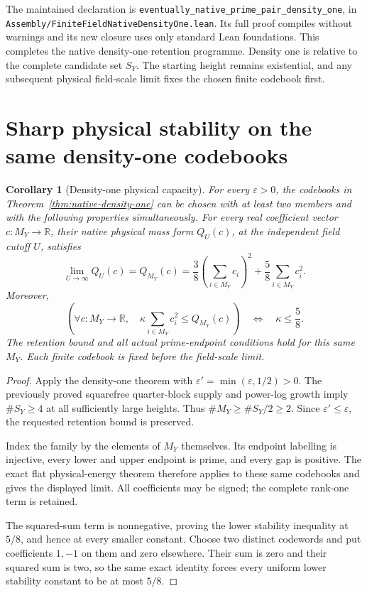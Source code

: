 \documentclass[11pt]{article}
\newtheorem{corollary}[theorem]{Corollary}
\begin{document}
The maintained declaration is
\texttt{eventually\_native\_prime\_pair\_density\_one}, in
\texttt{Assembly/\allowbreak FiniteFieldNativeDensityOne.\allowbreak lean}.
Its full proof compiles without warnings and its new closure
uses only standard Lean foundations.
This completes the native density-one retention programme.
Density one is relative to the complete candidate set \(S_Y\).
The starting height remains existential, and any subsequent
physical field-scale limit fixes the chosen finite codebook first.

\section{Sharp physical stability on the same density-one codebooks}
\label{sec:native-density-one-physical}

\begin{corollary}[Density-one physical capacity]
\label{cor:native-density-one-physical}
For every \(\varepsilon>0\), the codebooks in
Theorem~\ref{thm:native-density-one} can be chosen with at least
two members and with the following properties simultaneously.
For every real coefficient vector \(c:M_Y\to\mathbb R\), their
native physical mass form \(Q_U(c)\), at the independent field
cutoff \(U\), satisfies
\[
 \lim_{U\to\infty}Q_U(c)
   =Q_{M_Y}(c)
   =\frac38\left(\sum_{i\in M_Y}c_i\right)^2
       +\frac58\sum_{i\in M_Y}c_i^2.
\]
Moreover,
\[
 \left(\forall c:M_Y\to\mathbb R,\quad
       \kappa\sum_{i\in M_Y}c_i^2\le Q_{M_Y}(c)\right)
       \quad\Longleftrightarrow\quad \kappa\le\frac58 .
\]
The retention bound and all actual prime-endpoint conditions hold
for this same \(M_Y\). Each finite codebook is fixed before
the field-scale limit.
\end{corollary}

\begin{proof}
Apply the density-one theorem with
\(\varepsilon'=\min(\varepsilon,1/2)>0\).
The previously proved squarefree quarter-block supply and
power-log growth imply \(\#S_Y\ge4\) at all sufficiently large
heights. Thus \(\#M_Y\ge\#S_Y/2\ge2\).
Since \(\varepsilon'\le\varepsilon\), the requested retention
bound is preserved.

Index the family by the elements of \(M_Y\) themselves.
Its endpoint labelling is injective, every lower and upper
endpoint is prime, and every gap is positive.
The exact flat physical-energy theorem therefore applies to
these same codebooks and gives the displayed limit.
All coefficients may be signed; the complete rank-one term
is retained.

The squared-sum term is nonnegative, proving the lower
stability inequality at \(5/8\), and hence at every smaller
constant. Choose two distinct codewords and put coefficients
\(1,-1\) on them and zero elsewhere. Their sum is zero and
their squared sum is two, so the same exact identity forces
every uniform lower stability constant to be at most \(5/8\).
\end{proof}
\end{document}

